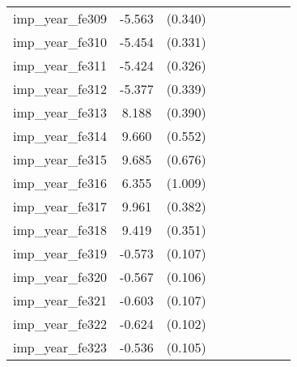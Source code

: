 {\begin{tabular}{l*{4}{cc}}
imp\_year\_fe309&   -5.563\sym{***}&  (0.340)&                  &         &                  &         &                  &         \\
imp\_year\_fe310&   -5.454\sym{***}&  (0.331)&                  &         &                  &         &                  &         \\
imp\_year\_fe311&   -5.424\sym{***}&  (0.326)&                  &         &                  &         &                  &         \\
imp\_year\_fe312&   -5.377\sym{***}&  (0.339)&                  &         &                  &         &                  &         \\
imp\_year\_fe313&    8.188\sym{***}&  (0.390)&                  &         &                  &         &                  &         \\
imp\_year\_fe314&    9.660\sym{***}&  (0.552)&                  &         &                  &         &                  &         \\
imp\_year\_fe315&    9.685\sym{***}&  (0.676)&                  &         &                  &         &                  &         \\
imp\_year\_fe316&    6.355\sym{***}&  (1.009)&                  &         &                  &         &                  &         \\
imp\_year\_fe317&    9.961\sym{***}&  (0.382)&                  &         &                  &         &                  &         \\
imp\_year\_fe318&    9.419\sym{***}&  (0.351)&                  &         &                  &         &                  &         \\
imp\_year\_fe319&   -0.573\sym{***}&  (0.107)&                  &         &                  &         &                  &         \\
imp\_year\_fe320&   -0.567\sym{***}&  (0.106)&                  &         &                  &         &                  &         \\
imp\_year\_fe321&   -0.603\sym{***}&  (0.107)&                  &         &                  &         &                  &         \\
imp\_year\_fe322&   -0.624\sym{***}&  (0.102)&                  &         &                  &         &                  &         \\
imp\_year\_fe323&   -0.536\sym{***}&  (0.105)&                  &         &                  &         &                  &         \\

\end{tabular}}
